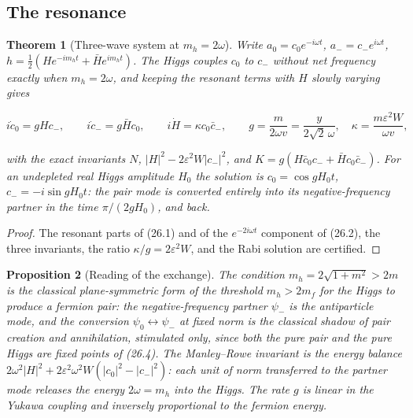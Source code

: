 \documentclass[11pt]{article}
\newtheorem{theorem}{Theorem}[section]
\newtheorem{proposition}[theorem]{Proposition}
\theoremstyle{remark}
\begin{document}
\subsection{The resonance}

\begin{theorem}[Three-wave system at \(m_h=2\omega\)]
\label{thm:v20v23-resonance}
Write \(a_0=c_0e^{-i\omega t}\), \(a_-=c_-e^{i\omega t}\),
\(h=\tfrac12(He^{-im_ht}+\bar He^{im_ht})\).  The Higgs couples \(c_0\)
to \(c_-\) without net frequency exactly when \(m_h=2\omega\), and
keeping the resonant terms with \(H\) slowly varying gives

\[
 i\dot c_0=gHc_-,\qquad i\dot c_-=g\bar Hc_0,\qquad i\dot H=\kappa c_0\bar c_-,\qquad
 g=\frac m{2\omega v}=\frac y{2\sqrt2\,\omega},\quad \kappa=\frac{m\varepsilon^2W}{\omega v},
                                                                    \tag{26.4}
\]

with the exact invariants \(N\), \(|H|^2-2\varepsilon^2W|c_-|^2\), and
\(K=g(H\bar c_0c_-+\bar Hc_0\bar c_-)\).  For an undepleted real
Higgs amplitude \(H_0\) the solution is \(c_0=\cos gH_0t\),
\(c_-=-i\sin gH_0t\): the pair mode is converted entirely into its
negative-frequency partner in the time \(\pi/(2gH_0)\), and back.
\end{theorem}

\begin{proof}
The resonant parts of (26.1) and of the \(e^{-2i\omega t}\) component
of (26.2), the three invariants, the ratio \(\kappa/g=2\varepsilon^2W\),
and the Rabi solution are certified.
\end{proof}

\begin{proposition}[Reading of the exchange]
\label{prop:v20v23-reading}
The condition \(m_h=2\sqrt{1+m^2}>2m\) is the classical
plane-symmetric form of the threshold \(m_h>2m_f\) for the Higgs to
produce a fermion pair: the negative-frequency partner \(\psi_-\) is
the antiparticle mode, and the conversion \(\psi_0\leftrightarrow\psi_-\)
at fixed norm is the classical shadow of pair creation and
annihilation, stimulated only, since both the pure pair and the pure
Higgs are fixed points of (26.4).  The Manley--Rowe invariant is the
energy balance \(2\omega^2|H|^2+2\varepsilon^2\omega^2W(|c_0|^2-|c_-|^2)\):
each unit of norm transferred to the partner mode releases the energy
\(2\omega=m_h\) into the Higgs.  The rate \(g\) is linear in the Yukawa
coupling and inversely proportional to the fermion energy.
\end{proposition}
\end{document}
